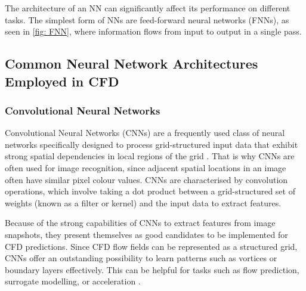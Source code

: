 The architecture of an NN can significantly affect its performance on different tasks. The simplest form of NNs are feed-forward neural networks (FNNs), as seen in \autoref{fig: FNN}, where information flows from input to output in a single pass.


\subsection{Common Neural Network Architectures Employed in CFD}
\label{subsect: commonNN}

\subsubsection{Convolutional Neural Networks}
Convolutional Neural Networks (CNNs) are a frequently used class of neural networks specifically designed to process grid-structured input data that exhibit strong spatial dependencies in local regions of the grid \cite{Aggarwal2018}. That is why CNNs are often used for image recognition, since adjacent spatial locations in an image often have similar pixel colour values. CNNs are characterised by convolution operations, which involve taking a dot product between a grid-structured set of weights (known as a filter or kernel) and the input data to extract features.

Because of the strong capabilities of CNNs to extract features from image snapshots, they present themselves as good candidates to be implemented for CFD predictions. Since CFD flow fields can be represented as a structured grid, CNNs offer an outstanding possibility to learn patterns such as vortices or boundary layers effectively. This can be helpful for tasks such as flow prediction, surrogate modelling, or acceleration \cite{Lee_You_2019, Guo2016}.




